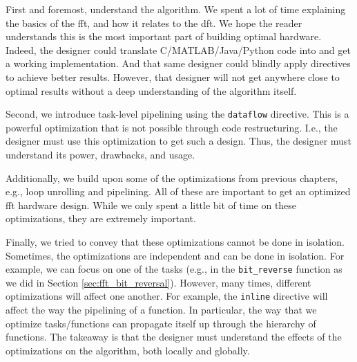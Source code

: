 First and foremost, understand the algorithm. We spent a lot of time explaining the basics of the \gls{fft}, and how it relates to the \gls{dft}. We hope the reader understands this is the most important part of building optimal hardware. Indeed, the designer could translate C/MATLAB/Java/Python code into \VHLS and get a working implementation. And that same designer could blindly apply directives to achieve better results. However, that designer will not get anywhere close to optimal results without a deep understanding of the algorithm itself.

Second, we introduce  task-level pipelining using the \lstinline{dataflow} directive. This is a powerful optimization that is not possible through code restructuring. I.e., the designer must use this optimization to get such a design. Thus, the designer must understand its power, drawbacks, and usage.

Additionally, we build upon some of the optimizations from previous chapters, e.g., loop unrolling and pipelining. All of these are important to get an optimized \gls{fft} hardware design. While we only spent a little bit of time on these optimizations, they are extremely important.

Finally, we tried to convey that these optimizations cannot be done in isolation. Sometimes, the optimizations are independent and can be done in isolation. For example, we can focus on one of the tasks (e.g., in the \lstinline{bit_reverse} function as we did in Section \ref{sec:fft_bit_reversal}). However, many times, different optimizations will affect one another. For example, the \lstinline{inline} directive will affect the way the pipelining of a function. In particular, the way that we optimize tasks/functions can propagate itself up through the hierarchy of functions.  The takeaway is that the designer must understand the effects of the optimizations on the algorithm, both locally and globally.
